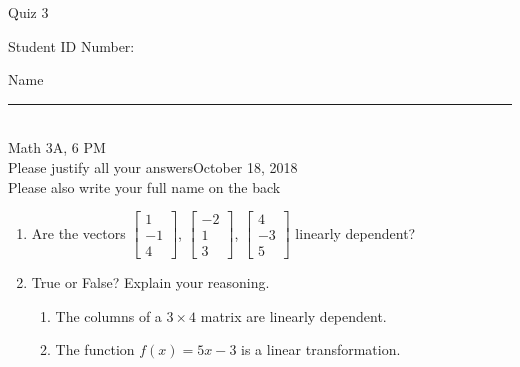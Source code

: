 \documentclass[12pt]{article}
\begin{document}
\begin{flushleft} 
\centerline{\LARGE{Quiz 3}} 
\vspace{5 mm}
{Student ID Number:}\hfill  
{Name \rule {2 in}{0.01in}}\\
Math 3A, 6 PM
\\
{Please justify all your answers}\hfill {October 18, 2018}
\\
{Please also write your full name on the back} 

\medskip
\end{flushleft}

\begin{enumerate}
	\item Are the vectors $\begin{bmatrix}
		1\\-1\\4
	\end{bmatrix}$, $\begin{bmatrix}
		-2\\1\\3
	\end{bmatrix}$, $\begin{bmatrix}
		4\\-3\\5
	\end{bmatrix}$ linearly dependent?

	\vfill

	\item True or False? Explain your reasoning.
	\begin{enumerate}
		\item The columns of a $3\times 4$ matrix are linearly dependent.
		\vfill
		\item The function $f(x) = 5x-3$ is a linear transformation.
		\vfill
	\end{enumerate}
\end{enumerate}

\end{document}
